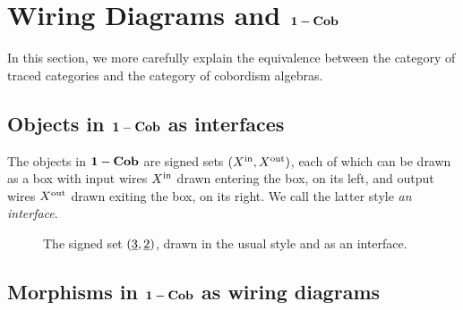 \chapter{Wiring Diagrams and $\mathbf{1-Cob}$}

In this section, we more carefully explain the equivalence between the category of traced categories and the category of cobordism algebras.

\section{Objects in $\mathbf{1-Cob}$ as interfaces}

The objects in $\mathbf{1-Cob}$ are signed sets $(X^{\text{in}},X^{\text{out}})$, each of which can be drawn as a box with input wires $X^{\text{in}}$ drawn entering the box, on its left, and output wires $X^{\text{out}}$ drawn exiting the box, on its right. We call the latter style \emph{an interface}.

\begin{figure}
\caption{The signed set $(\underline{3},\underline{2})$, drawn in the usual style and as an interface.}
\end{figure}

\section{Morphisms in $\mathbf{1-Cob}$ as wiring diagrams}

